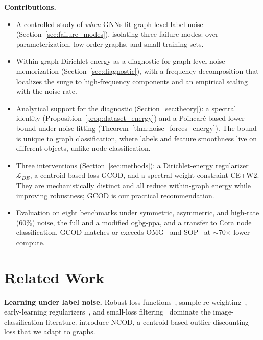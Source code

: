 \documentclass{article}
\theoremstyle{definition}
\newcommand{\method}{GCOD}
\begin{document}
\textbf{Contributions.}
\begin{itemize}[leftmargin=*,itemsep=0.5pt,topsep=2pt]
    \item A controlled study of \emph{when} GNNs fit graph-level label noise (Section~\ref{sec:failure_modes}), isolating three failure modes: over-parameterization, low-order graphs, and small training sets.
    \item Within-graph Dirichlet energy as a diagnostic for graph-level noise memorization (Section~\ref{sec:diagnostic}), with a frequency decomposition that localizes the surge to high-frequency components and an empirical scaling with the noise rate.
    \item Analytical support for the diagnostic (Section~\ref{sec:theory}): a spectral identity (Proposition~\ref{prop:dataset_energy}) and a Poincar\'e-based lower bound under noise fitting (Theorem~\ref{thm:noise_forces_energy}). The bound is unique to graph classification, where labels and feature smoothness live on different objects, unlike node classification.
    \item Three interventions (Section~\ref{sec:methods}): a Dirichlet-energy regularizer $\mathcal{L}_{DE}$, a centroid-based loss \method{}, and a spectral weight constraint CE+W2. They are mechanistically distinct and all reduce within-graph energy while improving robustness; \method{} is our practical recommendation.
    \item Evaluation on eight benchmarks under symmetric, asymmetric, and high-rate ($60\%$) noise, the full and a modified ogbg-ppa, and a transfer to Cora node classification. \method{} matches or exceeds OMG~\citep{omg7} and SOP~\citep{liu2022robusttraininglabelnoise} at $\sim$70$\times$ lower compute.
\end{itemize}

\section{Related Work}
\label{sec:related}

\textbf{Learning under label noise.} Robust loss functions~\citep{ghosh2017robust,patrini2017making}, sample re-weighting~\citep{liu2015classification,liu2022robusttraininglabelnoise}, early-learning regularizers~\citep{arpit2017closer}, and small-loss filtering~\citep{gui2021towards} dominate the image-classification literature. \citet{wani2023combining} introduce NCOD, a centroid-based outlier-discounting loss that we adapt to graphs.
\end{document}
